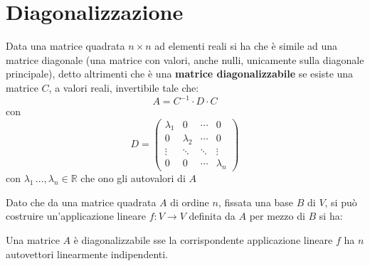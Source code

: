 \documentclass[a4paper,12pt, oneside]{book}
\begin{document}
\section{Diagonalizzazione}
\begin{definizione}
	Data una matrice quadrata $n\times n$ ad elementi reali si ha che è simile ad una matrice diagonale (una matrice con valori, anche nulli, unicamente sulla diagonale principale), detto altrimenti che è una\textbf{ matrice diagonalizzabile} se esiste una matrice $C$, a valori reali, invertibile tale che:
	$$A=C^{-1}\cdot D\cdot C$$
	con $$
		D=\left(\begin{matrix}
				\lambda_1 & 0         & \cdots & 0         \\
				0         & \lambda_2 & \cdots & 0         \\
				\vdots    & \ddots    & \ddots & \vdots    \\
				0         & 0         & \cdots & \lambda_n
			\end{matrix}\right)
	$$
	con $\lambda_1\,...,\lambda_n\in\mathbb{R}$ che ono gli autovalori di $A$
\end{definizione}
Dato che da una matrice quadrata $A$ di ordine $n$, fissata una base $B$ di $V$, si può costruire un'applicazione lineare $f:V\to V$ definita da $A$ per mezzo di $B$ si ha:
\begin{teorema}
	Una matrice $A$ è diagonalizzabile sse la corrispondente applicazione lineare $f$ ha $n$ autovettori linearmente indipendenti.
\end{teorema}
\end{document}
